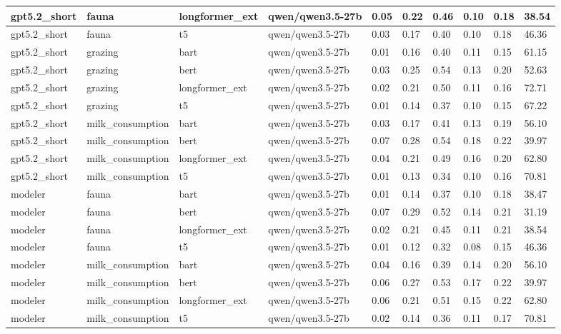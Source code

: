 \begin{tabular}{|l|l|l|l|l|l|l|l|l|l|}
 \hline
 gpt5.2\_short & fauna & longformer\_ext & qwen/qwen3.5-27b & 0.05 & 0.22 & 0.46 & 0.10 & 0.18 & 38.54 \\
 \hline
 gpt5.2\_short & fauna & t5 & qwen/qwen3.5-27b & 0.03 & 0.17 & 0.40 & 0.10 & 0.18 & 46.36 \\
 \hline
 gpt5.2\_short & grazing & bart & qwen/qwen3.5-27b & 0.01 & 0.16 & 0.40 & 0.11 & 0.15 & 61.15 \\
 \hline
 gpt5.2\_short & grazing & bert & qwen/qwen3.5-27b & 0.03 & 0.25 & 0.54 & 0.13 & 0.20 & 52.63 \\
 \hline
 gpt5.2\_short & grazing & longformer\_ext & qwen/qwen3.5-27b & 0.02 & 0.21 & 0.50 & 0.11 & 0.16 & 72.71 \\
 \hline
 gpt5.2\_short & grazing & t5 & qwen/qwen3.5-27b & 0.01 & 0.14 & 0.37 & 0.10 & 0.15 & 67.22 \\
 \hline
 gpt5.2\_short & milk\_consumption & bart & qwen/qwen3.5-27b & 0.03 & 0.17 & 0.41 & 0.13 & 0.19 & 56.10 \\
 \hline
 gpt5.2\_short & milk\_consumption & bert & qwen/qwen3.5-27b & 0.07 & 0.28 & 0.54 & 0.18 & 0.22 & 39.97 \\
 \hline
 gpt5.2\_short & milk\_consumption & longformer\_ext & qwen/qwen3.5-27b & 0.04 & 0.21 & 0.49 & 0.16 & 0.20 & 62.80 \\
 \hline
 gpt5.2\_short & milk\_consumption & t5 & qwen/qwen3.5-27b & 0.01 & 0.13 & 0.34 & 0.10 & 0.16 & 70.81 \\
 \hline
 modeler & fauna & bart & qwen/qwen3.5-27b & 0.01 & 0.14 & 0.37 & 0.10 & 0.18 & 38.47 \\
 \hline
 modeler & fauna & bert & qwen/qwen3.5-27b & 0.07 & 0.29 & 0.52 & 0.14 & 0.21 & 31.19 \\
 \hline
 modeler & fauna & longformer\_ext & qwen/qwen3.5-27b & 0.02 & 0.21 & 0.45 & 0.11 & 0.21 & 38.54 \\
 \hline
 modeler & fauna & t5 & qwen/qwen3.5-27b & 0.01 & 0.12 & 0.32 & 0.08 & 0.15 & 46.36 \\
 \hline
 modeler & milk\_consumption & bart & qwen/qwen3.5-27b & 0.04 & 0.16 & 0.39 & 0.14 & 0.20 & 56.10 \\
 \hline
 modeler & milk\_consumption & bert & qwen/qwen3.5-27b & 0.06 & 0.27 & 0.53 & 0.17 & 0.22 & 39.97 \\
 \hline
 modeler & milk\_consumption & longformer\_ext & qwen/qwen3.5-27b & 0.06 & 0.21 & 0.51 & 0.15 & 0.22 & 62.80 \\
 \hline
 modeler & milk\_consumption & t5 & qwen/qwen3.5-27b & 0.02 & 0.14 & 0.36 & 0.11 & 0.17 & 70.81 \\
\hline
\end{tabular}
